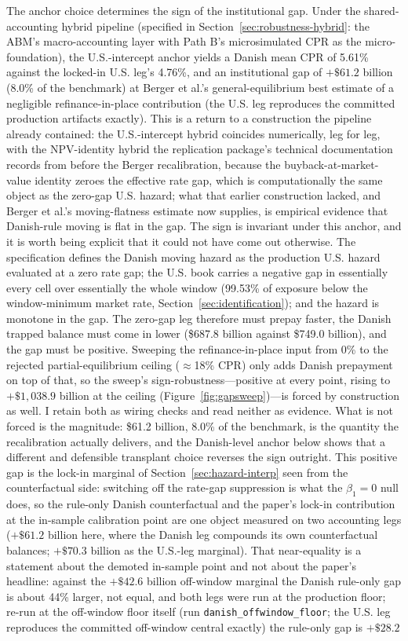 \documentclass[12pt]{article}
\begin{document}
The anchor choice determines the sign of the institutional gap. Under the shared-accounting hybrid pipeline (specified in Section~\ref{sec:robustness-hybrid}: the ABM's macro-accounting layer with Path B's microsimulated CPR as the micro-foundation), the U.S.-intercept anchor yields a Danish mean CPR of 5.61\% against the locked-in U.S. leg's 4.76\%, and an institutional gap of $+\$61.2$ billion (8.0\% of the benchmark) at Berger et al.'s general-equilibrium best estimate of a negligible refinance-in-place contribution (the U.S. leg reproduces the committed production artifacts exactly). This is a return to a construction the pipeline already contained: the U.S.-intercept hybrid coincides numerically, leg for leg, with the NPV-identity hybrid the replication package's technical documentation records from before the Berger recalibration, because the buyback-at-market-value identity zeroes the effective rate gap, which is computationally the same object as the zero-gap U.S. hazard; what that earlier construction lacked, and Berger et al.'s moving-flatness estimate now supplies, is empirical evidence that Danish-rule moving is flat in the gap. The sign is invariant under this anchor, and it is worth being explicit that it could not have come out otherwise. The specification defines the Danish moving hazard as the production U.S. hazard evaluated at a zero rate gap; the U.S. book carries a negative gap in essentially every cell over essentially the whole window (99.53\% of exposure below the window-minimum market rate, Section~\ref{sec:identification}); and the hazard is monotone in the gap. The zero-gap leg therefore must prepay faster, the Danish trapped balance must come in lower (\$687.8 billion against \$749.0 billion), and the gap must be positive. Sweeping the refinance-in-place input from 0\% to the rejected partial-equilibrium ceiling ($\approx$18\% CPR) only adds Danish prepayment on top of that, so the sweep's sign-robustness---positive at every point, rising to $+\$1{,}038.9$ billion at the ceiling (Figure~\ref{fig:gapsweep})---is forced by construction as well. I retain both as wiring checks and read neither as evidence. What is not forced is the magnitude: \$61.2 billion, 8.0\% of the benchmark, is the quantity the recalibration actually delivers, and the Danish-level anchor below shows that a different and defensible transplant choice reverses the sign outright. This positive gap is the lock-in marginal of Section~\ref{sec:hazard-interp} seen from the counterfactual side: switching off the rate-gap suppression is what the $\beta_1 = 0$ null does, so the rule-only Danish counterfactual and the paper's lock-in contribution at the in-sample calibration point are one object measured on two accounting legs ($+\$61.2$ billion here, where the Danish leg compounds its own counterfactual balances; $+\$70.3$ billion as the U.S.-leg marginal). That near-equality is a statement about the demoted in-sample point and not about the paper's headline: against the $+\$42.6$ billion off-window marginal the Danish rule-only gap is about 44\% larger, not equal, and both legs were run at the production floor; re-run at the off-window floor itself (run \texttt{danish\_offwindow\_floor}; the U.S. leg reproduces the committed off-window central exactly) the rule-only gap is $+\$28.2$ 
\end{document}
